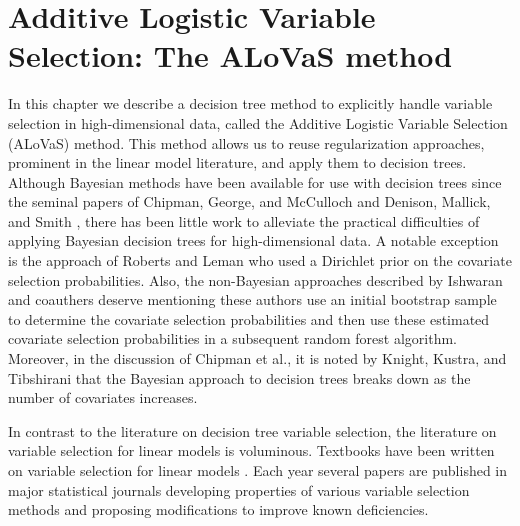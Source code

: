\section{Additive Logistic Variable Selection: The ALoVaS method}\label{sec:Introduction}

In this chapter we describe a decision tree method to explicitly handle variable selection in high-dimensional data, called the Additive Logistic Variable Selection  (ALoVaS) method. This method allows us to reuse regularization approaches, prominent in the linear model literature, and apply them to decision trees. Although Bayesian methods have been available for use with decision trees since the seminal papers of Chipman, George, and McCulloch \cite{chipman1998bayesian}  and Denison, Mallick, and Smith \cite{denison1998bayesian}, there has been little work to alleviate the practical difficulties of applying Bayesian decision trees for high-dimensional data. A notable exception is the approach of Roberts and Leman \cite{Roberts:2013uq} who used a Dirichlet prior on the covariate selection probabilities. Also, the non-Bayesian approaches described by Ishwaran and coauthers \cite{ishwaran2011random,ishwaran2010high,ishwaran2007variable} deserve mentioning these authors use an initial bootstrap sample to determine the covariate selection probabilities and then use these estimated covariate selection probabilities in a subsequent random forest algorithm. Moreover, in the discussion of Chipman et al., it is noted by Knight, Kustra, and Tibshirani \cite{knight1998bayesian} that the Bayesian approach to decision trees breaks down as the number of covariates increases. 

In contrast to the literature on decision tree variable selection, the literature on variable selection for linear models is voluminous. Textbooks have been written on variable selection for linear models \cite{miller2002subset}. Each year several papers are published in major statistical journals developing properties of various variable selection methods and proposing modifications to improve known deficiencies. 


